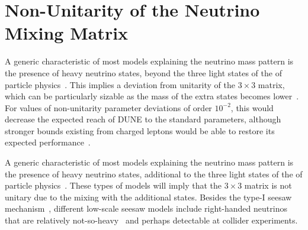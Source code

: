 

\section{Non-Unitarity of the Neutrino Mixing Matrix}
\label{sec:nonUnitarity}
A generic characteristic of most models explaining the neutrino mass
pattern is the presence of heavy neutrino states, beyond the
three light states of the   of particle
physics~\cite{Minkowski:1977sc,Mohapatra:1979ia,Yanagida:1979as,GellMann:1980vs}. This implies a deviation from unitarity of the $3\times3$  matrix, which can be particularly sizable %
as the mass of the extra states becomes lower~\cite{Lee:1977tib,Schechter:1980gr,Mohapatra:1986bd,Akhmedov:1995vm,Akhmedov:1995ip,Malinsky:2005bi}.
For values of non-unitarity parameter deviations of order $10^{-2}$, this would decrease the expected reach of DUNE to the standard parameters, although stronger bounds existing from charged leptons would be able to restore its expected performance~\cite{Blennow:2016jkn,Escrihuela:2016ube}.

A generic characteristic of most models explaining the neutrino mass
pattern is the presence of heavy neutrino states, additional to the
three light states of the   of particle
physics~\cite{Mohapatra:1998rq,Valle:2015pba,Fukugita:2003en}. These
types of models will imply that the $3 \times 3$  matrix is not unitary due to the mixing with the additional states.  Besides the type-I seesaw
mechanism~\cite{GellMann:1980vs,Yanagida:1979as,Mohapatra:1979ia,Schechter:1980gr},
different low-scale seesaw models include right-handed neutrinos that are relatively not-so-heavy~\cite{Mohapatra:1986bd} and perhaps detectable at collider experiments.

